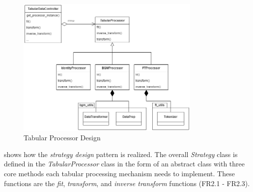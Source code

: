 \begin{figure}[h]
	\centering
	\includegraphics[width=0.8\textwidth]{images/tabular_processor.png}
	\caption[Tabular Processor Design]{Tabular Processor Design}
	\label{fig:tabular_processor}
\end{figure}

 shows how the \textit{strategy design} pattern is realized.
The overall \textit{Strategy} class is defined in the \textit{TabularProcessor} class in the form of an abstract class with three core methods each tabular processing mechanism needs to implement.
These functions are the \textit{fit}, \textit{transform}, and \textit{inverse transform} functions (FR2.1 - FR2.3).

